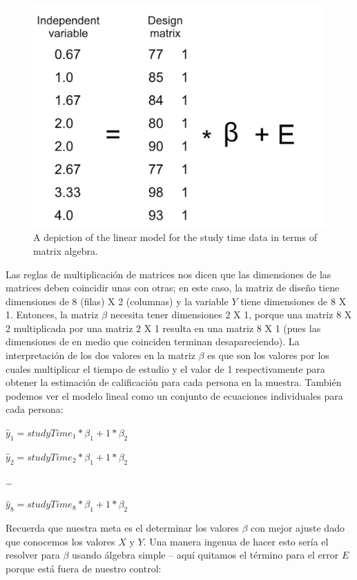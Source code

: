 \documentclass[
  12pt,
]{book}
\begin{document}
\begin{figure}
\centering
\includegraphics{images/glm_matrix.png}
\caption{\label{fig:GLMmatrix}A depiction of the linear model for the study time data in terms of matrix algebra.}
\end{figure}

Las reglas de multiplicación de matrices nos dicen que las dimensiones de las matrices deben coincidir unas con otras; en este caso, la matriz de diseño tiene dimensiones de 8 (filas) X 2 (columnas) y la variable \(Y\) tiene dimensiones de 8 X 1. Entonces, la matriz \(\beta\) necesita tener dimensiones 2 X 1, porque una matriz 8 X 2 multiplicada por una matriz 2 X 1 resulta en una matriz 8 X 1 (pues las dimensiones de en medio que coinciden terminan desapareciendo). La interpretación de los dos valores en la matriz \(\beta\) es que son los valores por los cuales multiplicar el tiempo de estudio y el valor de 1 respectivamente para obtener la estimación de calificación para cada persona en la muestra. También podemos ver el modelo lineal como un conjunto de ecuaciones individuales para cada persona:

\(\hat{y}_1 = studyTime_1*\beta_1 + 1*\beta_2\)

\(\hat{y}_2 = studyTime_2*\beta_1 + 1*\beta_2\)

\ldots{}

\(\hat{y}_8 = studyTime_8*\beta_1 + 1*\beta_2\)

Recuerda que nuestra meta es el determinar los valores \(\beta\) con mejor ajuste dado que conocemos los valores \(X\) y \(Y\). Una manera ingenua de hacer esto sería el resolver para \(\beta\) usando álgebra simple -- aquí quitamos el término para el error \(E\) porque está fuera de nuestro control:
\end{document}
